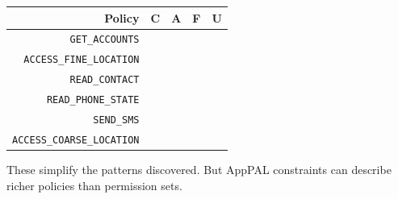\documentclass[]{soups-poster}
\newcommand{\xmark}{{\footnotesize\ding{55}}}
\newcommand{\citep}[1]{\cite{#1}}
\renewcommand{\rothead}[2][30]{\rlap{\makebox[4mm][l]{\rotatebox{#1}{\makecell[c]{\footnotesize \textsf{#2}}}}}}%
\begin{document}
\newcommand{\tabtitle}[1]{\textbf{\footnotesize #1}}
\begin{center}
  \begin{tabular}{ r l l l l }
    \toprule
    \tabtitle{Policy}                  & \tabtitle{C}           & \tabtitle{A}       & \tabtitle{F}          & \tabtitle{U}          \\
    \midrule
    \lstinline{GET_ACCOUNTS}           & \xmark                 & \xmark             & \xmark                & \xmark                \\
    \lstinline{ACCESS_FINE_LOCATION}   & \xmark                 & \xmark             & \xmark                &                       \\
    \lstinline{READ_CONTACT}           & \xmark                 & \xmark             & \xmark                &                       \\
    \lstinline{READ_PHONE_STATE}       & \xmark                 & \xmark             &                       &                       \\
    \lstinline{SEND_SMS}               & \xmark                 & \xmark             &                       &                       \\
    \lstinline{ACCESS_COARSE_LOCATION} & \xmark                 &                    &                       &                       \\
    \bottomrule
  \end{tabular}
\end{center}

These simplify the patterns discovered. %
But AppPAL constraints
can describe richer policies than permission sets.

%
%
%
\end{document}
